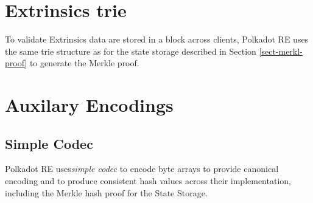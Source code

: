\documentclass{article}
\newcommand{\tmem}[1]{{\em #1\/}}
\newcommand{\tmtextit}[1]{{\itshape{#1}}}
\providecommand{\tmem}[1]{\tmtextit{#1}}
\providecommand{\tmtextit}[1]{\tmtextit{#1}}
\begin{document}
\section{Extrinsics trie}

To validate Extrinsics data are stored in a block across clients, Polkadot RE
uses the same trie structure as for the state storage described in Section
\ref{sect-merkl-proof} to generate the Merkle proof.

\section{Auxilary Encodings}

\subsection{Simple Codec}

Polkadot RE uses{\tmem{simple codec}} to encode byte arrays to provide
canonical encoding and to produce consistent hash values across their
implementation, including the Merkle hash proof for the State Storage.

\
\end{document}
